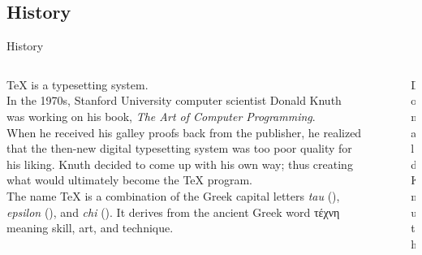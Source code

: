 \documentclass[10pt,xcolor={dvipsnames}, aspectratio=169]{beamer}
\begin{document}
\subsection{History}
	\begin{frame}{History}
	    \begin{columns}[T]
		    \begin{column}{0.8 \textwidth}
		    \textcolor{latexBird}{\TeX} \xspace is a \textcolor{latexBird}{typesetting system}.\\
		  \bigskip
            In the 1970s, Stanford University computer scientist \textcolor{latexBird}{Donald Knuth} was working on his book, \textit{The Art of Computer Programming}. \\
		    When he received his galley proofs back from the publisher, he realized that the then-new digital typesetting system was too poor quality for his liking. Knuth decided to come up with his own way; thus creating what would ultimately become the \TeX \xspace program.\\
            \bigskip
		    The name \TeX \xspace is a combination of the Greek capital letters \textit{tau} (\textTau), \textit{epsilon} (\textEpsilon), and \textit{chi} (\textChi). It derives from the ancient Greek word \textgreek{τέχνη} meaning skill, art, and technique.
			\end{column}
			\begin{column}{0.2 \textwidth}
			\vspace{0.5cm}
			\begin{figure}
                \captionsetup{justification=centering}
				\caption{Donald Knuth}
            \end{figure}
			\end{column}
		\end{columns}
	\end{frame}
\end{document}
